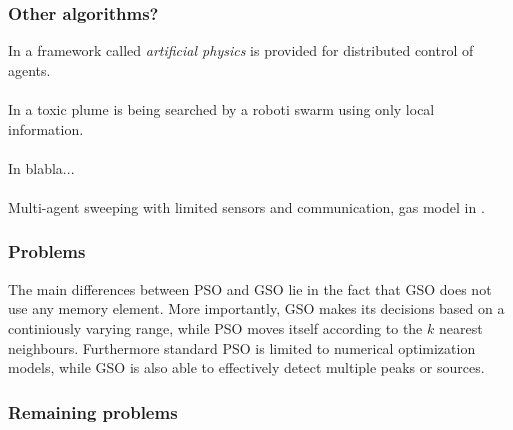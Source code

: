 \subsubsection{Other algorithms?}
	In \cite{zarzhitsky2005agent} a framework called \emph{artificial physics} is provided for distributed control of agents.\\
	\\
	In \cite{zarzhitsky2005distributed} a toxic plume is being searched by a roboti swarm using only local information. \\
	\\
	In \cite{shen2004hormone} blabla...\\
	\\
	Multi-agent sweeping with limited sensors and communication, gas model in \cite{kerr2005two}.

	\subsubsection{Problems}
	The main differences between PSO and GSO lie in the fact that GSO does not use any memory element. More importantly, GSO makes its decisions based on a continiously varying range, while PSO moves itself according to the $k$ nearest neighbours. Furthermore standard PSO is limited to numerical optimization models, while GSO is also able to effectively detect multiple peaks or sources.

	\subsubsection{Remaining problems}
